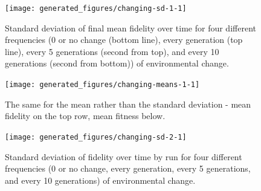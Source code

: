 \begin{knitrout}
\color{fgcolor}\begin{figure}[htp]
\texttt{[image: generated\_figures/changing-sd-1-1]} \caption[Standard deviation of final mean fidelity over time for four different frequencies (0 or no change (bottom line), every generation (top line), every 5 generations (second from top), and every 10 generations (second from bottom)) of environmental change]{Standard deviation of final mean fidelity over time for four different frequencies (0 or no change (bottom line), every generation (top line), every 5 generations (second from top), and every 10 generations (second from bottom)) of environmental change.}\label{fig:changing-sd-1}
\end{figure}


\end{knitrout}

\begin{knitrout}
\color{fgcolor}\begin{figure}[htp]
\texttt{[image: generated\_figures/changing-means-1-1]} \caption[The same for the mean rather than the standard deviation - mean fidelity on the top row, mean fitness below]{The same for the mean rather than the standard deviation - mean fidelity on the top row, mean fitness below.}\label{fig:changing-means-1}
\end{figure}


\end{knitrout}

\begin{knitrout}
\color{fgcolor}\begin{figure}[htp]
\texttt{[image: generated\_figures/changing-sd-2-1]} \caption[Standard deviation of fidelity over time by run for four different frequencies (0 or no change, every generation, every 5 generations, and every 10 generations) of environmental change]{Standard deviation of fidelity over time by run for four different frequencies (0 or no change, every generation, every 5 generations, and every 10 generations) of environmental change.}\label{fig:changing-sd-2}
\end{figure}


\end{knitrout}
%

